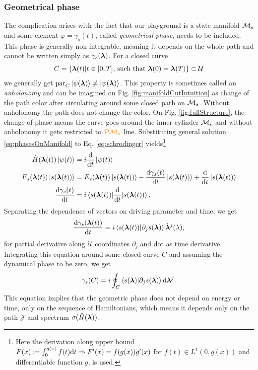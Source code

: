 \subsubsection{Geometrical phase}
The complication arises with the fact that our playground is a state manifold $\mathcal{M}_s$ and some element $\varphi=\gamma_s(t)$, called \emph{geometrical phase}, needs to be included. This phase is generally non-integrable, meaning it depends on the whole path and cannot be written simply as $\gamma_s({\bm\lambda})$. For a closed curve
\begin{equation}
    C=\{{\bm\lambda}(t)|t\in[0,T] \text{, such that }{\bm\lambda}(0)={\bm\lambda}(T)\}\subset \mathcal U
\end{equation} 
we generally get $\textrm{par}_C \ket{\psi({\bm\lambda})}\neq \ket{\psi({\bm\lambda})}$. This property is sometimes called an \emph{anholonomy} and can be imagined on Fig. \ref{fig:manifoldCutIntuition} as change of the path color after circulating around some closed path on $\mathcal{M}_s$. Without anholonomy the path does not change the color. On Fig. \ref{fig:fullStructure}, the change of phase means the curve goes around the inner cylinder $\mathcal{M}_s$ and without anholonomy it gets restricted to $\textcolor{orange}{\mathcal{P}\mathcal{M}_s}$ line. Substituting general solution \ref{eq:phasesOnManifold} to Eq. \ref{eq:schrodinger} yields\footnote{Here the derivation along upper bound $F(x)\coloneqq\int_0^{g(x)}f(t)\mathrm{d} t \Rightarrow F'(x)=f(g(x))g'(x)$ for $f(t)\in L^1(0,g(x))$ and differentiable function $g$, is used.} 
\begin{align}
    \hat{H}({\bm\lambda}(t))\ket{\psi(t)} &= i\frac{\mathrm{d} }{\mathrm{d} t}\ket{\psi(t)}\\
    E_s({\bm\lambda}(t)) \ket{s({\bm\lambda}(t))} &= E_s({\bm\lambda}(t))\ket{s({\bm\lambda}(t))} -\frac{\mathrm{d} \gamma_s(t)}{\mathrm{d} t}\ket{s({\bm\lambda}(t))}+ \frac{\mathrm{d} }{\mathrm{d} t}\ket{s({\bm\lambda}(t))}\\
    \frac{\mathrm{d} \gamma_s(t)}{\mathrm{d} t}&=i\braket{s({\bm\lambda}(t))|
    \frac{\mathrm{d} }{\mathrm{d} t}|s({\bm\lambda}(t))}.
\end{align}
 Separating the dependence of vectors on driving parameter and time, we get
\begin{equation}
    \frac{\mathrm{d} \gamma_s({\bm\lambda}(t))}{\mathrm{d} t} =i\braket{s({\bm\lambda}(t))|\partial_j s({\bm\lambda})} \dot{{\bm\lambda}}^j(\lambda),
\end{equation}
for partial derivative along $\mathcal U$ coordinates $\partial_j$ and dot as time derivative. Integrating this equation around some closed curve $C$ and assuming the dynamical phase to be zero, we get
\begin{equation}
    \gamma_s(C)=i\oint_C\braket{s({\bm\lambda})|\partial_j s({\bm\lambda})}\mathrm{d} {\bm\lambda}^j.
    \label{eq:gammaCoint}
\end{equation}
This equation implies that the geometric phase does not depend on energy or time, only on the sequence of Hamiltonians, which means it depends only on the path $\mathcal J$ and spectrum $\sigma(\hat{H}({\bm\lambda}))$.



